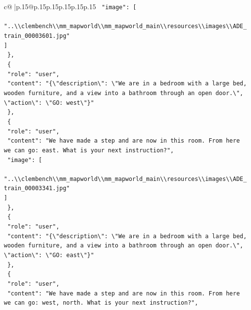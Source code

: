 \documentclass{article}
\begin{document}
{\begin{supertabular}{c@{$\;$}|p{.15\linewidth}@{}p{.15\linewidth}p{.15\linewidth}p{.15\linewidth}p{.15\linewidth}p{.15\linewidth}}
{{{\texttt{    "image": {[}} \\
\texttt{      "..\textbackslash{}\textbackslash{}clembench\textbackslash{}\textbackslash{}mm\_mapworld\textbackslash{}\textbackslash{}mm\_mapworld\_main\textbackslash{}\textbackslash{}resources\textbackslash{}\textbackslash{}images\textbackslash{}\textbackslash{}ADE\_train\_00003601.jpg"} \\
\texttt{    {]}} \\
\texttt{  \},} \\
\texttt{  \{} \\
\texttt{    "role": "user",} \\
\texttt{    "content": "\{\textbackslash{}"description\textbackslash{}": \textbackslash{}"We are in a bedroom with a large bed, wooden furniture, and a view into a bathroom through an open door.\textbackslash{}", \textbackslash{}"action\textbackslash{}": \textbackslash{}"GO: west\textbackslash{}"\}"} \\
\texttt{  \},} \\
\texttt{  \{} \\
\texttt{    "role": "user",} \\
\texttt{    "content": "We have made a step and are now in this room. From here we can go: east. What is your next instruction?",} \\
\texttt{    "image": {[}} \\
\texttt{      "..\textbackslash{}\textbackslash{}clembench\textbackslash{}\textbackslash{}mm\_mapworld\textbackslash{}\textbackslash{}mm\_mapworld\_main\textbackslash{}\textbackslash{}resources\textbackslash{}\textbackslash{}images\textbackslash{}\textbackslash{}ADE\_train\_00003341.jpg"} \\
\texttt{    {]}} \\
\texttt{  \},} \\
\texttt{  \{} \\
\texttt{    "role": "user",} \\
\texttt{    "content": "\{\textbackslash{}"description\textbackslash{}": \textbackslash{}"We are in a bedroom with a large bed, wooden furniture, and a view into a bathroom through an open door.\textbackslash{}", \textbackslash{}"action\textbackslash{}": \textbackslash{}"GO: east\textbackslash{}"\}"} \\
\texttt{  \},} \\
\texttt{  \{} \\
\texttt{    "role": "user",} \\
\texttt{    "content": "We have made a step and are now in this room. From here we can go: west, north. What is your next instruction?",} \\
}}}
\end{supertabular}}
\end{document}
